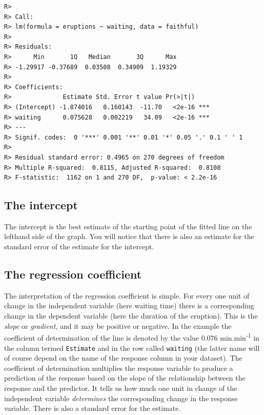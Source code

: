 \documentclass[english,10pt,a4paper,oneside]{book}
\theoremstyle{definition}
\theoremstyle{definition}
\theoremstyle{definition}
\theoremstyle{remark}
\begin{document}
\begin{verbatim}
R> 
R> Call:
R> lm(formula = eruptions ~ waiting, data = faithful)
R> 
R> Residuals:
R>      Min       1Q   Median       3Q      Max 
R> -1.29917 -0.37689  0.03508  0.34909  1.19329 
R> 
R> Coefficients:
R>              Estimate Std. Error t value Pr(>|t|)    
R> (Intercept) -1.874016   0.160143  -11.70   <2e-16 ***
R> waiting      0.075628   0.002219   34.09   <2e-16 ***
R> ---
R> Signif. codes:  0 '***' 0.001 '**' 0.01 '*' 0.05 '.' 0.1 ' ' 1
R> 
R> Residual standard error: 0.4965 on 270 degrees of freedom
R> Multiple R-squared:  0.8115, Adjusted R-squared:  0.8108 
R> F-statistic:  1162 on 1 and 270 DF,  p-value: < 2.2e-16
\end{verbatim}

\hypertarget{the-intercept}{%
\subsection{The intercept}\label{the-intercept}}

The intercept is the best estimate of the starting point of the fitted
line on the lefthand side of the graph. You will notice that there is
also an estimate for the standard error of the estimate for the
intercept.

\hypertarget{the-regression-coefficient}{%
\subsection{The regression
coefficient}\label{the-regression-coefficient}}

The interpretation of the regression coefficient is simple. For every
one unit of change in the independent variable (here waiting time) there
is a corresponding change in the dependent variable (here the duration
of the eruption). This is the \emph{slope} or \emph{gradient}, and it
may be positive or negative. In the example the coefficient of
determination of the line is denoted by the value 0.076
min.min\textsuperscript{-1} in the column termed \texttt{Estimate} and
in the row called \texttt{waiting} (the latter name will of course
depend on the name of the response column in your dataset). The
coefficient of determination multiplies the response variable to produce
a prediction of the response based on the slope of the relationship
between the response and the predictor. It tells us how much one unit in
change of the independent variable \emph{determines} the corresponding
change in the response variable. There is also a standard error for the
estimate.
\end{document}
